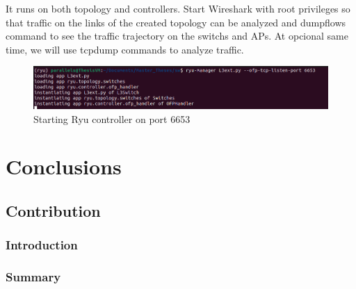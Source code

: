 \documentclass[
  oneside,
  11pt, a4paper,
  footinclude=true,
  headinclude=true,
  cleardoublepage=empty
]{scrbook}
\begin{document}
It runs on both topology and controllers. Start Wireshark with root privileges so that traffic on the links of the created topology can be analyzed and dumpflows command to see the traffic trajectory on the switchs and APs. At opcional same time, we will use tcpdump commands to analyze traffic.







\begin{figure}[H]
\begin{center}
  \includegraphics[width=1\textwidth]{img/startingRyu.png}
\end{center}
  \caption{Starting Ryu controller on port 6653}
  \centering  
  \label{startingRyu}
\end{figure}




\part{Conclusions}

\chapter{Contribution}
\section{Introduction}
\section{Summary}

\end{document}

